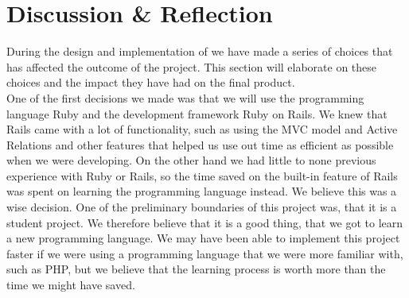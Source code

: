 













\section{Discussion \& Reflection}
\label{sec:discussion}
During the design and implementation of \projectname{} we have made a series of choices that has affected the outcome of the project.
This section will elaborate on these choices and the impact they have had on the final product. \\

One of the first decisions we made was that we will use the programming language Ruby and the development framework Ruby on Rails. 
We knew that Rails came with a lot of functionality, such as using the MVC model and Active Relations and other features that helped us use out time as efficient as possible when we were developing. 
On the other hand we had little to none previous experience with Ruby or Rails, so the time saved on the built-in feature of Rails was spent on learning the programming language instead.
We believe this was a wise decision. 
One of the preliminary boundaries of this project was, that it is a student project. 
We therefore believe that it is a good thing, that we got to learn a new programming language. 
We may have been able to implement this project faster if we were using a programming language that we were more familiar with, such as PHP, but we believe that the learning process is worth more than the time we might have saved. \\

